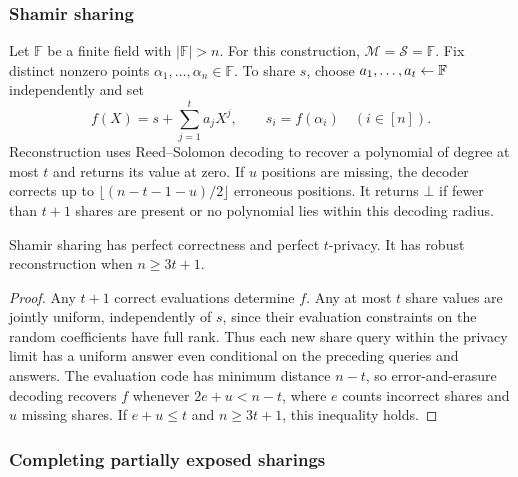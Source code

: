 \subsubsection{Shamir sharing}
Let $\mathbb F$ be a finite field with $|\mathbb F|>n$.
For this construction, $\mathcal M=\mathcal S=\mathbb F$.
Fix distinct nonzero points $\alpha_1,\ldots,\alpha_n\in\mathbb F$.
To share $s$, choose $a_1,\ldots,a_t\mathrel{\leftarrow}\mathbb F$ independently and set
\[
  f(X)=s+\sum_{j=1}^t a_jX^j,
  \qquad s_i=f(\alpha_i)\quad(i\in[n]).
\]
Reconstruction uses Reed--Solomon decoding to recover a polynomial of
degree at most $t$ and returns its value at zero.  If $u$ positions are
missing, the decoder corrects up to
$\lfloor(n-t-1-u)/2\rfloor$ erroneous positions.  It returns $\bot$
if fewer than $t+1$ shares are present or no polynomial lies within this
decoding radius.

\begin{proposition}
\label{prop:shamir-sharing}
Shamir sharing has perfect correctness and perfect $t$-privacy.
It has robust reconstruction when $n\geq3t+1$.
\end{proposition}
\begin{proof}
Any $t+1$ correct evaluations determine $f$.  Any at most $t$ share
values are jointly uniform, independently of $s$, since their evaluation
constraints on the random coefficients have full rank.  Thus each new
share query within the privacy limit has a uniform answer even conditional
on the preceding queries and answers.
The evaluation code has minimum distance $n-t$, so error-and-erasure
decoding recovers $f$ whenever $2e+u<n-t$, where $e$ counts incorrect
shares and $u$ missing shares.  If $e+u\leq t$ and $n\geq3t+1$, this
inequality holds.
\end{proof}

\subsubsection{Completing partially exposed sharings}

